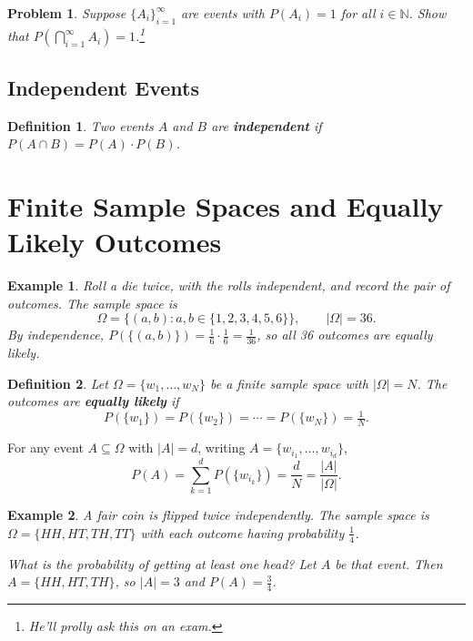 \documentclass{article}
\newtheorem{definition}{Definition}
\newtheorem{problem}{Problem}
\newtheorem*{example}{Example}
\begin{document}
\begin{problem}
Suppose $\{A_i\}_{i=1}^\infty$ are events with $P(A_i) = 1$ for all $i \in \mathbb{N}$. Show that $P\!\left(\bigcap_{i=1}^\infty A_i\right) = 1$.\footnote{He'll prolly ask this on an exam.}
\end{problem}

\subsection{Independent Events}

\begin{definition}
Two events $A$ and $B$ are \textbf{independent} if $P(A \cap B) = P(A) \cdot P(B)$.
\end{definition}

\section{Finite Sample Spaces and Equally Likely Outcomes}

\begin{example}
Roll a die twice, with the rolls independent, and record the pair of outcomes. The sample space is
\[
\Omega = \{(a, b) : a, b \in \{1, 2, 3, 4, 5, 6\}\}, \qquad |\Omega| = 36.
\]
By independence, $P(\{(a, b)\}) = \tfrac{1}{6} \cdot \tfrac{1}{6} = \tfrac{1}{36}$, so all 36 outcomes are equally likely.
\end{example}

\begin{definition}
Let $\Omega = \{w_1, \ldots, w_N\}$ be a finite sample space with $|\Omega| = N$. The outcomes are \textbf{equally likely} if
\[
P(\{w_1\}) = P(\{w_2\}) = \cdots = P(\{w_N\}) = \tfrac{1}{N}.
\]
\end{definition}

For any event $A \subseteq \Omega$ with $|A| = d$, writing $A = \{w_{i_1}, \ldots, w_{i_d}\}$,
\[
P(A) = \sum_{k=1}^d P(\{w_{i_k}\}) = \frac{d}{N} = \frac{|A|}{|\Omega|}.
\]

\begin{example}
A fair coin is flipped twice independently. The sample space is $\Omega = \{HH, HT, TH, TT\}$ with each outcome having probability $\tfrac{1}{4}$.

\textit{What is the probability of getting at least one head?} Let $A$ be that event. Then $A = \{HH, HT, TH\}$, so $|A| = 3$ and $P(A) = \tfrac{3}{4}$.
\end{example}
\end{document}
